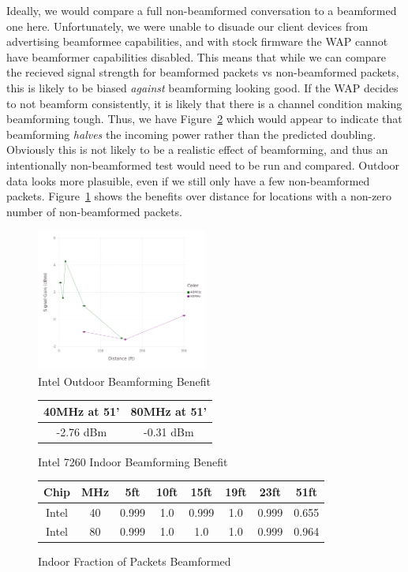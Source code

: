 Ideally, we would compare a full non-beamformed conversation to a
beamformed one here. Unfortunately, we were unable to disuade our
client devices from advertising beamformee capabilities, and with
stock firmware the WAP cannot have beamformer capabilities disabled.
This means that while we can compare the recieved signal strength for
beamformed packets vs non-beamformed packets, this is likely to be
biased \emph{against} beamforming looking good. If the WAP decides to
not beamform consistently, it is likely that there is a channel
condition making beamforming tough. Thus, we have Figure~\ref{fig:intelindoorbeamresult}
which would appear to indicate that beamforming \emph{halves} the
incoming power rather than the predicted doubling. Obviously this is
not likely to be a realistic effect of beamforming, and thus an
intentionally non-beamformed test would need to be run and
compared. Outdoor data looks more plasuible, even if we still only
have a few non-beamformed
packets. Figure~\ref{fig:inteloutdoorbeambenefit} shows the benefits
over distance for locations with a non-zero number of non-beamformed
packets.
\begin{figure}[!h]
\centering
\includegraphics[width=0.5\textwidth]{figures/Intel_Outside_Beamforming_Benefit}
\caption{Intel Outdoor Beamforming Benefit}
\label{fig:inteloutdoorbeambenefit}
\end{figure}

\begin{figure}[h!]
\centering
\begin{tabular}{| c | c |}
\hline
40MHz at 51' & 80MHz at 51'\\ \hline
-2.76 dBm &  -0.31 dBm\\ \hline
\end{tabular}
\caption{Intel 7260 Indoor Beamforming Benefit}
\label{fig:intelindoorbeamresult}
\end{figure}

\begin{figure}[b!]
\centering
\begin{tabular}{| c | c || c | c | c | c | c | c |}
\hline
Chip & MHz & 5ft & 10ft & 15ft & 19ft & 23ft & 51ft\\ \hline
Intel & 40 & 0.999 & 1.0 & 0.999 & 1.0 & 0.999 & 0.655\\ \hline
Intel & 80 & 0.999 & 1.0 & 1.0 & 1.0 & 0.999 & 0.964\\ \hline
\end{tabular}
\caption{Indoor Fraction of Packets Beamformed}
\label{fig:indoorbeampercent}
\end{figure}


